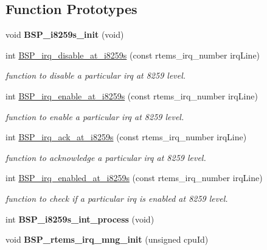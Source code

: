 \subsection*{Function Prototypes}
\begin{DoxyCompactItemize}
\item 
\mbox{\label{group__mips__i8259__irq_gad212efac7a3ac19484ed637d0fb5420b}} 
void {\bfseries B\+S\+P\+\_\+i8259s\+\_\+init} (void)
\item 
int \mbox{\hyperlink{group__mips__i8259__irq_ga2cbf3b2287a4937b96bacd73ce4ce3c7}{B\+S\+P\+\_\+irq\+\_\+disable\+\_\+at\+\_\+i8259s}} (const rtems\+\_\+irq\+\_\+number irq\+Line)
\begin{DoxyCompactList}\small\item\em function to disable a particular irq at 8259 level. \end{DoxyCompactList}\item 
int \mbox{\hyperlink{group__mips__i8259__irq_ga0504c1761cd7a8b649a5794ac4f15afe}{B\+S\+P\+\_\+irq\+\_\+enable\+\_\+at\+\_\+i8259s}} (const rtems\+\_\+irq\+\_\+number irq\+Line)
\begin{DoxyCompactList}\small\item\em function to enable a particular irq at 8259 level. \end{DoxyCompactList}\item 
int \mbox{\hyperlink{group__mips__i8259__irq_ga71748a7cd08c833484dc27fe32dafeb5}{B\+S\+P\+\_\+irq\+\_\+ack\+\_\+at\+\_\+i8259s}} (const rtems\+\_\+irq\+\_\+number irq\+Line)
\begin{DoxyCompactList}\small\item\em function to acknowledge a particular irq at 8259 level. \end{DoxyCompactList}\item 
\mbox{\label{group__mips__i8259__irq_gad45f6f265e31986fe1a820cd0b82339e}} 
int \mbox{\hyperlink{group__mips__i8259__irq_gad45f6f265e31986fe1a820cd0b82339e}{B\+S\+P\+\_\+irq\+\_\+enabled\+\_\+at\+\_\+i8259s}} (const rtems\+\_\+irq\+\_\+number irq\+Line)
\begin{DoxyCompactList}\small\item\em function to check if a particular irq is enabled at 8259 level. \end{DoxyCompactList}\item 
\mbox{\label{group__mips__i8259__irq_gabe7c16b42b7d19392ba99b07a24605e3}} 
int {\bfseries B\+S\+P\+\_\+i8259s\+\_\+int\+\_\+process} (void)
\item 
\mbox{\label{group__mips__i8259__irq_ga01af45dd0d6e61b9ba6361e07db81214}} 
void {\bfseries B\+S\+P\+\_\+rtems\+\_\+irq\+\_\+mng\+\_\+init} (unsigned cpu\+Id)
\end{DoxyCompactItemize}


